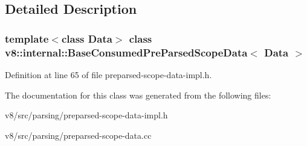 \subsection{Detailed Description}
\subsubsection*{template$<$class Data$>$\newline
class v8\+::internal\+::\+Base\+Consumed\+Pre\+Parsed\+Scope\+Data$<$ Data $>$}



Definition at line 65 of file preparsed-\/scope-\/data-\/impl.\+h.



The documentation for this class was generated from the following files\+:\begin{DoxyCompactItemize}
\item 
v8/src/parsing/preparsed-\/scope-\/data-\/impl.\+h\item 
v8/src/parsing/preparsed-\/scope-\/data.\+cc\end{DoxyCompactItemize}
